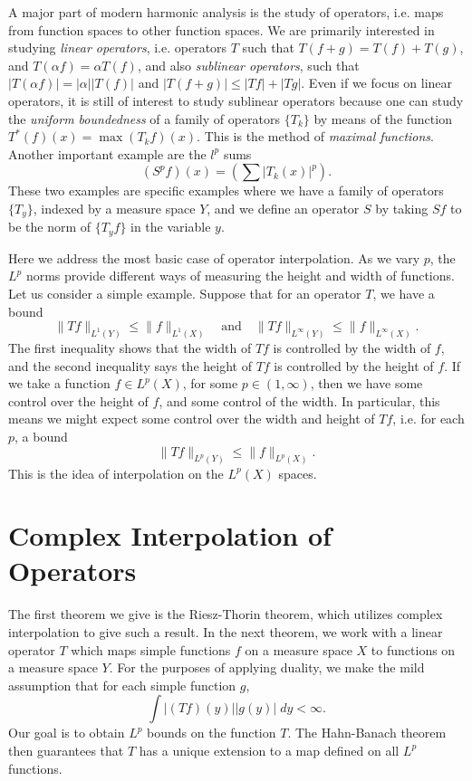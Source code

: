 A major part of modern harmonic analysis is the study of operators, i.e. maps from function spaces to other function spaces. We are primarily interested in studying \emph{linear operators}, i.e. operators $T$ such that $T(f + g) = T(f) + T(g)$, and $T(\alpha f) = \alpha T(f)$, and also \emph{sublinear operators}, such that $|T(\alpha f)| = |\alpha| |T(f)|$ and $|T(f + g)| \leq |Tf| + |Tg|$. Even if we focus on linear operators, it is still of interest to study sublinear operators because one can study the \emph{uniform boundedness} of a family of operators $\{ T_k \}$ by means of the function $T^*(f)(x) = \max (T_k f)(x)$. This is the method of \emph{maximal functions}. Another important example are the $l^p$ sums
%
\[ (S^p f)(x) = \left( \sum |T_k(x)|^p \right). \]
%
These two examples are specific examples where we have a family of operators $\{ T_y \}$, indexed by a measure space $Y$, and we define an operator $S$ by taking $Sf$ to be the norm of $\{ T_y f \}$ in the variable $y$.

Here we address the most basic case of operator interpolation. As we vary $p$, the $L^p$ norms provide different ways of measuring the height and width of functions. Let us consider a simple example. Suppose that for an operator $T$, we have a bound
%
\[ \| Tf \|_{L^1(Y)} \leq \| f \|_{L^1(X)} \quad\text{and}\quad \| Tf \|_{L^\infty(Y)} \leq \| f \|_{L^\infty(X)}. \]
%
The first inequality shows that the width of $Tf$ is controlled by the width of $f$, and the second inequality says the height of $Tf$ is controlled by the height of $f$. If we take a function $f \in L^p(X)$, for some $p \in (1,\infty)$, then we have some control over the height of $f$, and some control of the width. In particular, this means we might expect some control over the width and height of $Tf$, i.e. for each $p$, a bound
%
\[ \| Tf \|_{L^p(Y)} \leq \| f \|_{L^p(X)}. \]
%
This is the idea of interpolation on the $L^p(X)$ spaces.

\section{Complex Interpolation of Operators}

The first theorem we give is the Riesz-Thorin theorem, which utilizes complex interpolation to give such a result. In the next theorem, we work with a linear operator $T$ which maps simple functions $f$ on a measure space $X$ to functions on a measure space $Y$. For the purposes of applying duality, we make the mild assumption that for each simple function $g$,
%
\[ \int |(Tf)(y)| |g(y)|\; dy < \infty. \]
%
Our goal is to obtain $L^p$ bounds on the function $T$. The Hahn-Banach theorem then guarantees that $T$ has a unique extension to a map defined on all $L^p$ functions.

